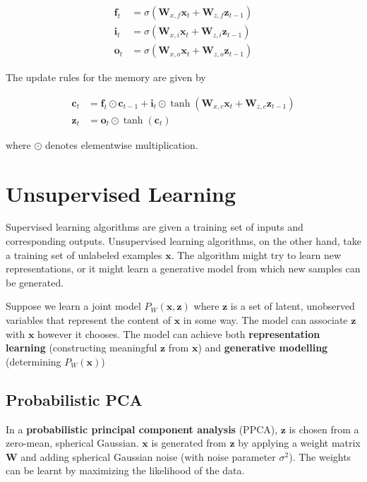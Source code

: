 \documentclass{article}
\renewcommand{\vec}[1]{\textbf{#1}}
\begin{document}
\begin{align*}
\vec{f}_t &= \sigma(\vec{W}_{x,f}\vec{x}_t + \vec{W}_{z,f}\vec{z}_{t-1}) \\
\vec{i}_t &= \sigma(\vec{W}_{x,i}\vec{x}_t + \vec{W}_{z,i}\vec{z}_{t-1}) \\
\vec{o}_t &= \sigma(\vec{W}_{x,o}\vec{x}_t + \vec{W}_{z,o}\vec{z}_{t-1})
\end{align*}

The update rules for the memory are given by

\begin{align*}
\vec{c}_t &= \vec{f}_t \odot \vec{c}_{t-1} + \vec{i}_t \odot \tanh(\vec{W}_{x,c} \vec{x}_t + \vec{W}_{z,c} \vec{z}_{t-1})  \\
\vec{z}_t &= \vec{o}_t \odot \tanh(\vec{c}_t)
\end{align*}

where $\odot$ denotes elementwise multiplication.

\section{Unsupervised Learning}

Supervised learning algorithms are given a training set of inputs and corresponding
outputs. Unsupervised learning algorithms, on the other hand, take a training set
of unlabeled examples $\vec{x}$. The algorithm might try to learn new representations,
or it might learn a generative model from which new samples can be generated.

Suppose we learn a joint model $P_W(\vec{x}, \vec{z})$ where $\vec{z}$ is a set of
latent, unobserved variables that represent the content of $\vec{x}$ in some way.
The model can associate $\vec{z}$ with $\vec{x}$ however it chooses. The model
can achieve both \textbf{representation learning} (constructing meaningful $\vec{z}$ from
$\vec{x}$) and \textbf{generative modelling} (determining $P_W(\vec{x})$)

\subsection{Probabilistic PCA}

In a \textbf{probabilistic principal component analysis} (PPCA), $\vec{z}$ is chosen
from a zero-mean, spherical Gaussian. $\vec{x}$ is generated from $\vec{z}$ by applying
a weight matrix $\vec{W}$ and adding spherical Gaussian noise (with noise parameter
$\sigma^2$). The weights can be learnt by maximizing the likelihood of the data.
\end{document}
